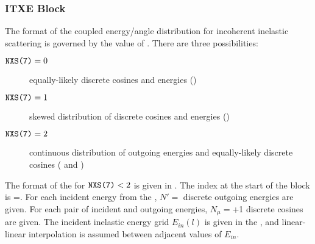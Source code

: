 \subsubsection{\textsf{ITXE} Block}\label{sec:ITXEBlock}

The format of the coupled energy/angle distribution for incoherent inelastic scattering is governed by the value of . There are three possibilities:
\begin{description}
  \item[$\texttt{NXS(7)}=0$] equally-likely discrete cosines and energies ()
  \item[$\texttt{NXS(7)}=1$] skewed distribution of discrete cosines and energies ()
  \item[$\texttt{NXS(7)}=2$] continuous distribution of outgoing energies and equally-likely discrete cosines ( and )
\end{description}

The format of the  for $\texttt{NXS(7)}<2$ is given in . The index at the start of the block is =. For each incident energy from the , $N'=$ discrete outgoing energies are given. For each pair of incident and outgoing energies, $N_\mu=$+1 discrete cosines are given. The incident inelastic energy grid $E_{in}(l)$ is given in the , and linear-linear interpolation is assumed between adjacent values of $E_{in}$.


